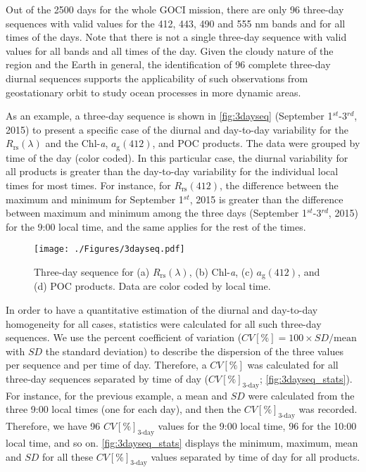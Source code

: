\documentclass[remotesensing,article,submit,moreauthors,pdftex,10pt,a4paper]{Definitions/mdpi}
\begin{document}
Out of the 2500 days for the whole GOCI mission, there are only 96 three-day sequences with valid values for the 412, 443, 490 and 555 nm bands and for all times of the days. Note that there is not a single three-day sequence with valid values for all bands and all times of the day. Given the cloudy nature of the region and the Earth in general, the identification of 96 complete three-day diurnal sequences supports the applicability of such observations from geostationary orbit to study ocean processes in more dynamic areas. 

As an example, a three-day sequence is shown in \autoref{fig:3dayseq} (September 1$^{st}$-3$^{rd}$, 2015) to present a specific case of the diurnal and day-to-day variability for the $R_\text{rs}(\lambda)$ and the Chl-{\it a}, $a_\text{g}(412)$, and POC products. The data were grouped by time of the day (color coded). In this particular case, the diurnal variability for all products is greater than the day-to-day variability for the individual local times for most times. For instance, for $R_\text{rs}(412)$, the difference between the maximum and minimum for September 1$^{st}$, 2015 is greater than the difference between maximum and minimum among the three days (September 1$^{st}$-3$^{rd}$, 2015) for the 9:00 local time, and the same applies for the rest of the times. 

\begin{figure}[htbp!]

\centering
\hspace{-0.8cm}
\texttt{[image: ./Figures/3dayseq.pdf]}
\caption{Three-day sequence for (a) $R_\text{rs}(\lambda)$, (b) Chl-{\it a}, (c) $a_\text{g}(412)$, and (d) POC products. Data are color coded by local time.\label{fig:3dayseq} }     

\end{figure}
In order to have a quantitative estimation of the diurnal and day-to-day homogeneity for all cases, statistics were calculated for all such three-day sequences. We use the percent coefficient of variation ($CV[\%] = 100 \times SD/\text{mean}$ with $SD$ the standard deviation) to describe the dispersion of the three values per sequence and per time of day. Therefore, a $CV[\%]$ was calculated for all three-day sequences separated by time of day ($CV[\%]_\text{3-day}$; \autoref{fig:3dayseq_stats}). For instance, for the previous example, a mean and $SD$ were calculated from the three 9:00 local times (one for each day), and then the $CV[\%]_\text{3-day}$ was recorded. Therefore, we have 96 $CV[\%]_\text{3-day}$ values for the 9:00 local time, 96 for the 10:00 local time, and so on. \autoref{fig:3dayseq_stats} displays the minimum, maximum, mean and $SD$ for all these $CV[\%]_\text{3-day}$ values separated by time of day for all products. 
\end{document}
